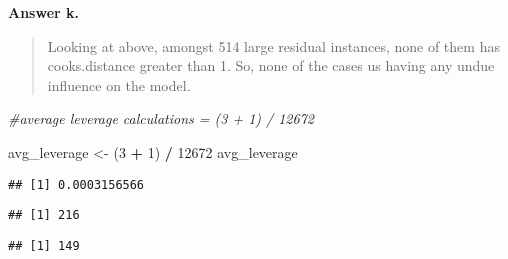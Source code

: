 \documentclass[
]{article}
\newenvironment{Shaded}{\begin{snugshade}}{\end{snugshade}}
\newcommand{\CommentTok}[1]{\textcolor[rgb]{0.56,0.35,0.01}{\textit{#1}}}
\newcommand{\DecValTok}[1]{\textcolor[rgb]{0.00,0.00,0.81}{#1}}
\newcommand{\KeywordTok}[1]{\textcolor[rgb]{0.13,0.29,0.53}{\textbf{#1}}}
\newcommand{\NormalTok}[1]{#1}
\newcommand{\OperatorTok}[1]{\textcolor[rgb]{0.81,0.36,0.00}{\textbf{#1}}}
\newcommand{\StringTok}[1]{\textcolor[rgb]{0.31,0.60,0.02}{#1}}
\begin{document}
\textbf{Answer k.}

\begin{quote}
Looking at above, amongst 514 large residual instances, none of them has
cooks.distance greater than 1. So, none of the cases us having any undue
influence on the model.
\end{quote}

\begin{Shaded}
\begin{Highlighting}[]
\CommentTok{#average leverage calculations = (3 + 1) / 12672}

\NormalTok{avg_leverage <-}\StringTok{ }\NormalTok{(}\DecValTok{3} \OperatorTok{+}\StringTok{ }\DecValTok{1}\NormalTok{) }\OperatorTok{/}\StringTok{ }\DecValTok{12672}
\NormalTok{avg_leverage}
\end{Highlighting}
\end{Shaded}

\begin{verbatim}
## [1] 0.0003156566
\end{verbatim}

\begin{Shaded}
\end{Shaded}

\begin{verbatim}
## [1] 216
\end{verbatim}

\begin{Shaded}
\end{Shaded}

\begin{verbatim}
## [1] 149
\end{verbatim}
\end{document}
